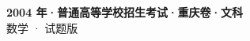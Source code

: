 \documentclass[zihao=-4, a4paper]{ctexart}
\begin{document}
\begin{center}
  {\Large\bfseries 2004 年·普通高等学校招生考试·重庆卷·文科}\\[4pt]
  {\large 数学 · 试题版}
\end{center}
\medskip
{}

\end{document}
